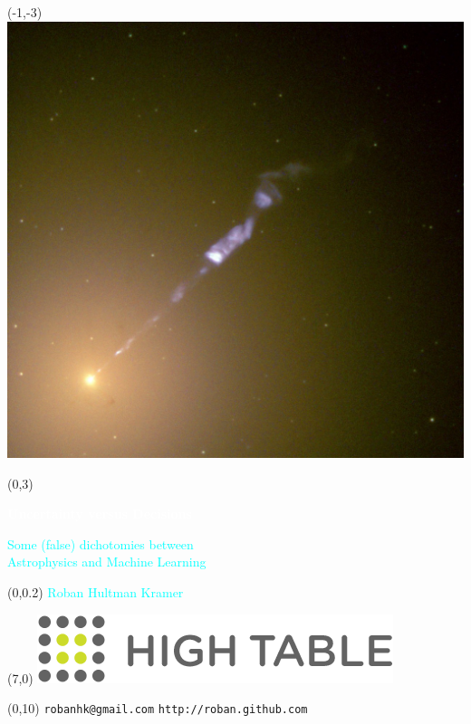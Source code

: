 \documentclass{article}
\renewcommand{\small}       {\fontsize{12}{14}\selectfont}
\renewcommand{\large}       {\fontsize{17.28}{22}\selectfont}
\renewcommand{\Large}       {\fontsize{20.74}{25}\selectfont}
\renewcommand{\huge}        {\fontsize{26.5}{32}\selectfont}
\renewcommand{\Huge}        {\fontsize{35.83}{45}\selectfont}
\def\Title#1{\noindent\begin{center}{\Huge\color{Red}#1}\end{center}}
\def\Subtitle#1{\noindent\begin{center}{\huge\color{DarkBlue}#1}\end{center}}
\begin{document}
\hypersetup{pdfpageduration=20}
\large

\pagecolor{white}

\begin{textblock}{10}(-1,-3)\Large\centering
\includegraphics[width=12\TPHorizModule]{images/M87.jpg}
\end{textblock}

\begin{textblock}{10}(0,3)
\Title{\textcolor{white}{\textbf{Uncertainty versus Decisions}}}
\Subtitle{\textcolor{Cyan}{Some (false) dichotomies between\\ Astrophysics and Machine Learning}}
\end{textblock}

\begin{textblock}{10}(0,0.2)
\large \textcolor{Cyan}{Roban Hultman Kramer}
\end{textblock}

\begin{textblock}{3}(7,0)
\includegraphics[width=3\TPHorizModule]{images/ht-logo.png}
\end{textblock}

\begin{textblock}{10}(0,10)\centering
\small
\texttt{robanhk@gmail.com} \hspace{1in} \texttt{http://roban.github.com}
\end{textblock}
\end{document}
